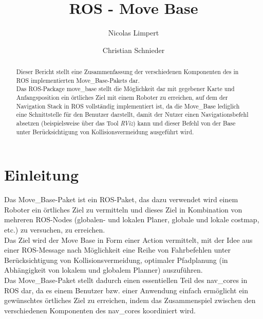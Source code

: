 \documentclass[oribibl]{llncs}
\begin{document}
 \title{ROS - Move Base}

\author{Nicolas Limpert \and Christian Schnieder} 

\maketitle


\begin{abstract} Dieser Bericht stellt eine Zusammenfassung der verschiedenen Komponenten des in ROS implementierten Move\_Base-Pakets dar.\\
Das ROS-Package move\_base stellt  die Möglichkeit dar mit gegebener Karte und Anfangsposition ein örtliches Ziel mit einem Roboter zu erreichen, auf dem der Navigation Stack\cite{navigation} in ROS vollständig implementiert ist, da die Move\_Base lediglich eine Schnittstelle für den Benutzer darstellt, damit der Nutzer einen Navigationsbefehl absetzen (beispielsweise über das Tool \textit{RViz}) kann und dieser Befehl von der Base unter Berücksichtigung von Kollisionsvermeidung ausgeführt wird.\end{abstract}


\section{Einleitung}
Das Move\_Base-Paket ist ein ROS-Paket, das dazu verwendet wird einem Roboter ein örtliches Ziel zu vermitteln und dieses Ziel in Kombination von mehreren ROS-Nodes (globalen- und lokalen Planer, globale und lokale costmap, etc.) zu versuchen, zu erreichen.\\
Das Ziel wird der Move Base in Form einer Action vermittelt, mit der Idee aus einer ROS-Message nach Möglichkeit eine Reihe von Fahrbefehlen unter Berücksichtigung von Kollisionsvermeidung, optimaler Pfadplanung (in Abhängigkeit von lokalem und globalem Planner) auszuführen.\\
Das Move\_Base-Paket stellt dadurch einen essentiellen Teil des nav\_cores in ROS dar, da es einem Benutzer bzw. einer Anwendung einfach ermöglicht ein gewünschtes örtliches Ziel zu erreichen, indem das Zusammenspiel zwischen den verschiedenen Komponenten des nav\_cores koordiniert wird.
\end{document}
